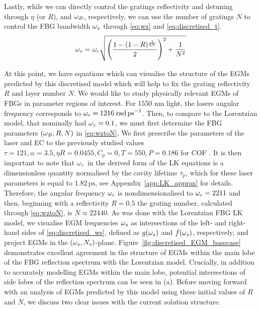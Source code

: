%
Lastly, while we can directly control the gratings reflectivity and detuning through $\eta$ (or $R$), and $\omega_B$, respectively, 
we can use the number of gratings $N$ to control the FBG bandwidth $\omega_z$ through \eqref{eq:wz} and \eqref{eq:discretised_t}.
%
\begin{equation}
    \label{eq:wztoN}
    \omega_z = \omega_c \sqrt{\left( \frac{1 - (1 - R)^\frac{1}{2N}}{2} \right)^2 + \frac{1}{N^2}}
\end{equation}
%
\par
%
At this point, we have equations which can visualise the structure of the EGMs predicted by this discretised model which will help to fix the grating reflectivity $R$ and layer number $N$. 
We would like to study physically relevant EGMs of FBGs in parameter regions of interest. 
For 1550 nm light, the lasers angular frequency corresponds to $\omega_c=1216\;\text{rad\,ps}^{-1}$. 
Then, to compare to the Lorentzian model, that nominally had $\omega_z = 0.1$, we must first determine the FBG parameters $(\omega_B, R, N)$ in \eqref{eq:wztoN}. 
We first prescribe the parameters of the laser and EC to the previously studied values $\tau = 121, \alpha = 3.5, \eta R = 0.0455, C_p = 0, T = 550, P = 0.186$ for COF \cite{heil2003delay}. 
It is then important to note that $\omega_z$ in the derived form of the LK equations is a dimensionless quantity normalised by the cavity lifetime $\tau_p$, 
which for these laser parameters is equal to $1.82 \,\text{ps}$, see Appendix~\ref{app:LK_approx} for details. 
Therefore, the angular frequency $\omega_c$ is nondimensionalised to $\omega_c=2211$ and then, beginning with a reflectivity $R = 0.5$ the grating number, calculated through \eqref{eq:wztoN}, is $N \approx 22440$. 
As was done with the Lorentzian FBG LK model, we visualise EGM frequencies $\omega_s$ as intersections of the left- and right-hand sides of \eqref{eq:discretised_ws}, 
defined as $g(\omega_s)$ and $f(\omega_s)$, respectively, and project EGMs in the $(\omega_s, N_s)$-plane. 
Figure~\ref{fig:discretised_EGM_basecase} demonstrates excellent agreement in the structure of EGMs within the main lobe of the FBG reflection spectrum with the Lorentzian model. 
Crucially, in addition to accurately modelling EGMs within the main lobe, potential intersections of side lobes of the reflection spectrum can be seen in (a). 
Before moving forward with an analysis of EGMs predicted by this model using these initial values of $R$ and $N$, we discuss two clear issues with the current solution structure. 
